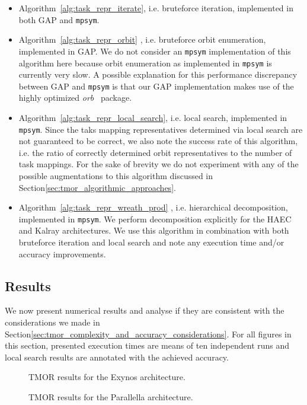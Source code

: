 \begin{itemize}
\item Algorithm~\ref{alg:task_repr_iterate}, i.e. bruteforce iteration,
implemented in both GAP and \texttt{mpsym}.

\item Algorithm~\ref{alg:task_repr_orbit} , i.e. bruteforce orbit enumeration,
implemented in GAP. We do not consider an \texttt{mpsym} implementation of this
algorithm here because orbit enumeration as implemented in \texttt{mpsym} is
currently very slow. A possible explanation for this performance discrepancy
between GAP and \texttt{mpsym} is that our GAP implementation makes use of the
highly optimized \textit{orb}~\cite{orb} package.

\item Algorithm~\ref{alg:task_repr_local_search}, i.e. local search,
implemented in \texttt{mpsym}. Since the taks mapping representatives
determined via local search are not guaranteed to be correct, we also note the
success rate of this algorithm, i.e. the ratio of correctly determined orbit
representatives to the number of task mappings.  For the sake of brevity we do
not experiment with any of the possible augmentations to this algorithm
discussed in Section\ref{sec:tmor_algorithmic_approaches}.

\item Algorithm~\ref{alg:task_repr_wreath_prod} , i.e. hierarchical
decomposition, implemented in \texttt{mpsym}. We perform decomposition
explicitly for the HAEC and Kalray architectures. We use this algorithm in
combination with both bruteforce iteration and local search and note any
execution time and/or accuracy improvements.
\end{itemize}

\subsection{Results}
\label{sec:exp_repr_results}

We now present numerical results and analyse if they are consistent with the
considerations we made in
Section\ref{sec:tmor_complexity_and_accuracy_considerations}.  For all figures
in this section, presented execution times are means of ten independent runs
and local search results are annotated with the achieved accuracy.

\begin{figure}
  \centering
  
  \caption{TMOR results for the Exynos architecture.}
  \label{fig:exynos_lineplot}
  \vspace{1cm}
  
  \caption{TMOR results for the Parallella architecture.}
  \label{fig:parallella_lineplot}
\end{figure}


